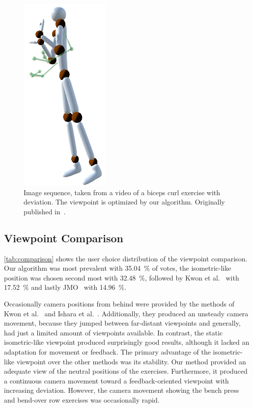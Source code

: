 \begin{figure}[h]
	\includegraphics[width=0.11\linewidth]{pictures/bicepsSequence8.png}\hfill
	\caption{Image sequence, taken from a video of a biceps curl exercise with deviation. The viewpoint is optimized by our algorithm. Originally published in~\cite{diller2024automatic}.}
	\label{fig:bicepsSequence}
\end{figure}

\subsection{Viewpoint Comparison \label{sec:results:comparison}}
\autoref{tab:comparison} shows the user choice distribution of the viewpoint comparison. Our algorithm was most prevalent with 35.04~\% of votes, the isometric-like position was chosen second most with 32.48~\%, followed by Kwon et al.~\cite{kwon2020ocp} with 17.52~\% and lastly JMO~\cite{ishara2015mra} with 14.96~\%.

Occasionally camera positions from behind were provided by the methods of Kwon et al.~\cite{kwon2020ocp} and Ishara et al.~\cite{ishara2015mra}. Additionally, they produced an unsteady camera movement, because they jumped between far-distant viewpoints and generally, had just a limited amount of viewpoints available. In contrast, the static isometric-like viewpoint produced surprisingly good results, although it lacked an adaptation for movement or feedback. The primary advantage of the isometric-like viewpoint over the other methods was its stability. Our method provided an adequate view of the neutral positions of the exercises. Furthermore, it produced a continuous camera movement toward a feedback-oriented viewpoint with increasing deviation. However, the camera movement showing the bench press and bend-over row exercises was occasionally rapid.

